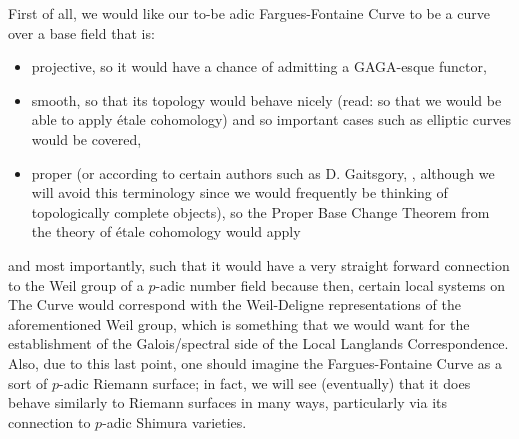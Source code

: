                 \begin{remark} \label{remark: motivating_the_fargues_fontaine_curve}
                    First of all, we would like our to-be adic Fargues-Fontaine Curve to be a curve over a base field that is:
                        \begin{itemize}
                            \item projective, so it would have a chance of admitting a GAGA-esque functor,
                            \item smooth, so that its topology would behave nicely (read: so that we would be able to apply \'etale cohomology) and so important cases such as elliptic curves would be covered, 
                            \item proper (or according to certain authors such as D. Gaitsgory, , although we will avoid this terminology since we would frequently be thinking of topologically complete objects), so the Proper Base Change Theorem from the theory of \'etale cohomology would apply 
                        \end{itemize}
                    and most importantly, such that it would have a very straight forward connection to the Weil group of a $p$-adic number field because then, certain local systems on The Curve would correspond with the Weil-Deligne representations of the aforementioned Weil group, which is something that we would want for the establishment of the Galois/spectral side of the Local Langlands Correspondence. Also, due to this last point, one should imagine the Fargues-Fontaine Curve as a sort of $p$-adic Riemann surface; in fact, we will see (eventually) that it does behave similarly to Riemann surfaces in many ways, particularly via its connection to $p$-adic Shimura varieties.
                \end{remark}
                
